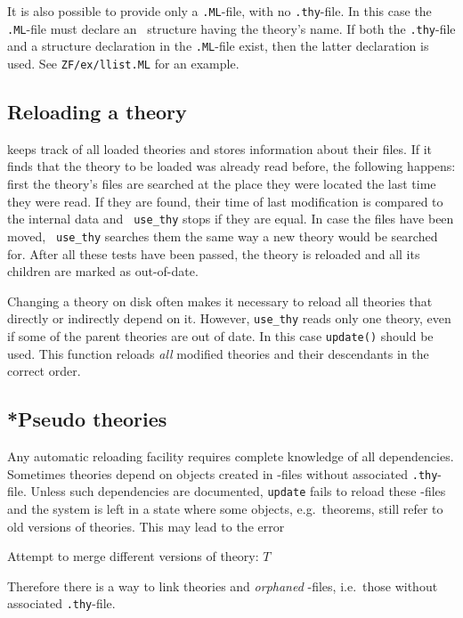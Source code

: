 It is also possible to provide only a {\tt.ML}-file, with no
{\tt.thy}-file.  In this case the {\tt.ML}-file must declare an \ML\
structure having the theory's name.  If both the {\tt.thy}-file and a
structure declaration in the {\tt.ML}-file exist, then the latter
declaration is used.  See {\tt ZF/ex/llist.ML} for an example.


\subsection{Reloading a theory}

 keeps track of all loaded theories and stores information
about their files.  If it finds that the theory to be loaded was already read
before, the following happens: first the theory's files are searched at the
place they were located the last time they were read. If they are found,
their time of last modification is compared to the internal data and {\tt
  use_thy} stops if they are equal. In case the files have been moved, {\tt
  use_thy} searches them the same way a new theory would be searched for.
After all these tests have been passed, the theory is reloaded and all
its children are marked as out-of-date.
\begin{warn}
  Changing a theory on disk often makes it necessary to reload all theories
  that directly or indirectly depend on it. However, {\tt use_thy} reads only
  one theory, even if some of the parent theories are out of date. In this
  case {\tt update()} should be used.  This function reloads {\em all\/}
  modified theories and their descendants in the correct order.
\end{warn}


\subsection{*Pseudo theories}

Any automatic reloading facility requires complete knowledge of all
dependencies. Sometimes theories depend on objects created in \ML-files
without associated {\tt.thy}-file. Unless such dependencies are documented,
{\tt update} fails to reload these \ML-files and the system is left in a
state where some objects, e.g.\ theorems, still refer to old versions of
theories. This may lead to the error
\begin{ttbox}
Attempt to merge different versions of theory: \(T\)
\end{ttbox}
Therefore there is a way to link theories and {\em orphaned\/} \ML-files,
i.e.\ those without associated {\tt.thy}-file.

